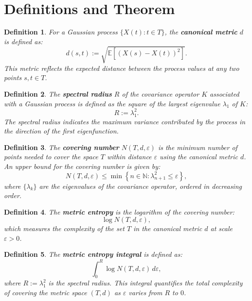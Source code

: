 \documentclass[12pt]{article}
\begin{document}
\newtheorem{theorem}{Theorem}
\newtheorem{definition}{Definition}

\section*{Definitions and Theorem}

\begin{definition}
For a Gaussian process $\{X(t) : t \in T\}$, the \textbf{canonical metric} $d$ is defined as:
\[
d(s, t) := \sqrt{\mathbb{E}[(X(s) - X(t))^2]}.
\]
This metric reflects the expected distance between the process values at any two points $s, t \in T$.
\end{definition}

\begin{definition}
The \textbf{spectral radius} $R$ of the covariance operator $K$ associated with a Gaussian process is defined as the square of the largest eigenvalue $\lambda_1$ of $K$:
\[
R := \lambda_1^2.
\]
The spectral radius indicates the maximum variance contributed by the process in the direction of the first eigenfunction.
\end{definition}

\begin{definition}
The \textbf{covering number} $N(T, d, \varepsilon)$ is the minimum number of points needed to cover the space $T$ within distance $\varepsilon$ using the canonical metric $d$. An upper bound for the covering number is given by:
\[
N(T, d, \varepsilon) \leq \min \left\{ n \in \mathbb{N} : \lambda_{n+1}^2 \leq \varepsilon \right\},
\]
where $\{\lambda_k\}$ are the eigenvalues of the covariance operator, ordered in decreasing order.
\end{definition}

\begin{definition}
The \textbf{metric entropy} is the logarithm of the covering number:
\[
\log N(T, d, \varepsilon),
\]
which measures the complexity of the set $T$ in the canonical metric $d$ at scale $\varepsilon > 0$.
\end{definition}

\begin{definition}
The \textbf{metric entropy integral} is defined as:
\[
\int_0^R \log N(T, d, \varepsilon) \, d\varepsilon,
\]
where $R := \lambda_1^2$ is the spectral radius. This integral quantifies the total complexity of covering the metric space $(T, d)$ as $\varepsilon$ varies from $R$ to $0$.
\end{definition}
\end{document}

